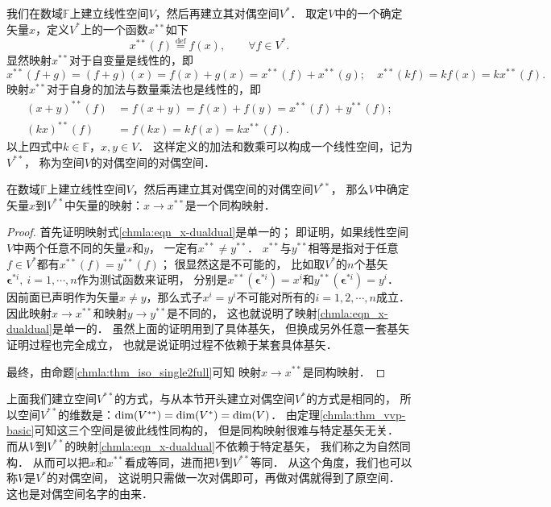 我们在数域$\mathbb{F}$上建立线性空间$V$，然后再建立其对偶空间$V^*$．
取定$V$中的一个{\kaishu 确定}矢量$x$，定义$V^*$上的一个函数$x^{**}$如下
\begin{equation}\label{chmla:eqn_x-dualdual}
    x^{**}(f)\overset{\mathrm {def}}{=}f(x), \qquad \forall f \in V^*.
\end{equation}
显然映射$x^{**}$对于自变量是线性的，即
\begin{equation*}
    x^{**}(f+g) {=}  (f+g)(x)=f(x)+g(x)=x^{**}(f)+x^{**}(g); \quad
    x^{**}(kf) {=}  k f(x) = k x^{**}(f).
\end{equation*}
映射$x^{**}$对于自身的加法与数量乘法也是线性的，即
\begin{align*}
    (x+y) ^{**}(f) &{=}  f(x+y)= f(x)+ f(y)= x^{**}(f)+y^{**}(f); \\
    (kx) ^{**}(f) &{=}  f(kx) =k f(x)=k x^{**}(f).
\end{align*}
以上四式中$k\in \mathbb{F}$，$x,y\in V$．
这样定义的加法和数乘可以构成一个线性空间，记为$V^{**}$，
称为空间$V$的对偶空间的对偶空间．

\begin{theorem}\label{chmla:thm_vvss_zrtg}
    在数域$\mathbb{F}$上建立线性空间$V$，然后再建立其对偶空间的对偶空间$V^{**}$，
    那么$V$中确定矢量$x$到$V^{**}$中矢量的映射：$x \to x^{**}$是一个同构映射．
\end{theorem}
\begin{proof}
    首先证明映射式\eqref{chmla:eqn_x-dualdual}是单一的；
    即证明，如果线性空间$V$中两个任意不同的矢量$x$和$y$，
    一定有$x^{**} \neq y^{**}$．
    $x^{**}$与$y^{**}$相等是指对于任意$f\in V^*$都有$x^{**}(f) = y^{**}(f)$；
    很显然这是不可能的，
    比如取$V^*$的$n$个基矢$\boldsymbol{\epsilon}^{*i}, \ i=1,\cdots,n$作为测试函数来证明，
    分别是$x^{**}(\boldsymbol{\epsilon}^{*i})=x^i$和$y^{**}(\boldsymbol{\epsilon}^{*i})=y^i$．
    因前面已声明作为矢量$x\neq y$，那么式子$x^i=y^i$不可能对所有的$i=1,2,\cdots,n$成立．
    因此映射$x\to x^{**}$和映射$y\to y^{**}$是不同的，
    这也就说明了映射\eqref{chmla:eqn_x-dualdual}是单一的．
    虽然上面的证明用到了具体基矢，
    但换成另外任意一套基矢证明过程也完全成立，
    也就是说证明过程不依赖于某套具体基矢．

    最终，由命题\ref{chmla:thm_iso_single2full}可知
    映射$x \to x^{**}$是同构映射．
\end{proof}

上面我们建立空间$V^{**}$的方式，与从本节开头建立对偶空间$V^{*}$的方式是相同的，
所以空间$V^{**}$的维数是：${\rm dim}(V^{**})={\rm dim}(V^{*})={\rm dim}(V)$．
由定理\ref{chmla:thm_vvp-basic}可知这三个空间是彼此线性同构的，
但是同构映射很难与特定基矢无关．
而从$V$到$V^{**}$的映射\eqref{chmla:eqn_x-dualdual}不依赖于特定基矢，
我们称之为{\heiti 自然同构}．
从而可以把$x$和$x^{**}$看成等同，进而把$V$到$V^{**}$等同．
从这个角度，我们也可以称$V$是$V^*$的对偶空间，
这说明只需做一次对偶即可，再做对偶就得到了原空间．
这也是对偶空间名字的由来．

